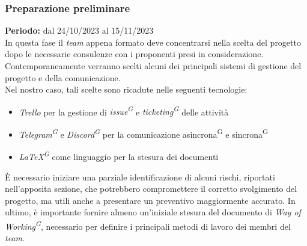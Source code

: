 \documentclass[5pt]{article}
\begin{document}
    \subsubsection{Preparazione preliminare}
      \textbf{Periodo:} dal 24/10/2023 al 15/11/2023 
      \vspace{0.3cm} \\
      In questa fase il \textit{team} appena formato deve concentrarsi nella scelta del progetto dopo le necessarie consulenze con i proponenti presi in considerazione. \\
      Contemporaneamente verranno scelti alcuni dei principali sistemi di gestione del progetto e della comunicazione. \\
      Nel nostro caso, tali scelte sono ricadute nelle seguenti tecnologie: 
      \begin{itemize}
        \item \textit{Trello} per la gestione di \textit{issue\textsuperscript{G}} e \textit{ticketing\textsuperscript{G}} delle attività
        \item \textit{Telegram\textsuperscript{G}} e \textit{Discord\textsuperscript{G}} per la comunicazione asincrona\textsuperscript{G} e sincrona\textsuperscript{G}
        \item \textit{\LaTeX\textsuperscript{G}} come linguaggio per la stesura dei documenti
      \end{itemize}
      È necessario iniziare una parziale identificazione di alcuni rischi, riportati nell'apposita sezione, che potrebbero compromettere il corretto svolgimento del progetto, 
      ma utili anche a presentare un preventivo maggiormente accurato. 
      In ultimo, è importante fornire almeno un'iniziale stesura del documento di \textit{Way of Working\textsuperscript{G}}, necessario per definire i principali metodi di lavoro dei membri del \textit{team}.
    
\end{document}
